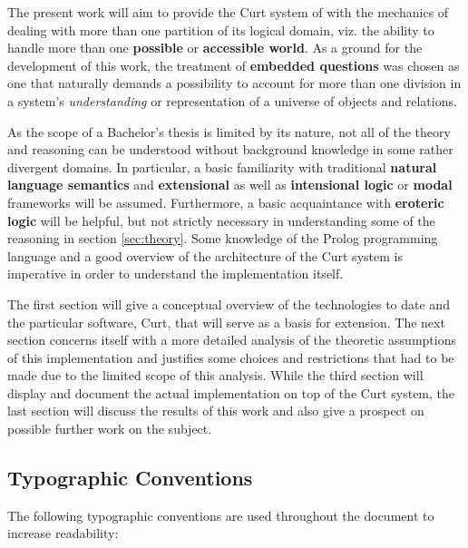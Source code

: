 \documentclass[a4paper]{article}
\newcommand{\term}[1]{\textsf{\textbf{#1}}} %
\newcommand{\pn}{\textsf} %
\newcommand{\curt}{\pn{Curt}}
\newcommand{\prol}{\pn{Prolog}}
\theoremstyle{remark}
\theoremstyle{remark}
\theoremstyle{definition}
\theoremstyle{definition}
\begin{document}
The present work will aim to provide the \curt{} system of
\cite{blackburnbos:cl1} with the mechanics of dealing with more than one
partition of its logical domain, viz. the ability to handle more than one
\term{possible} or \term{accessible world}. As a ground for the development of this
work, the treatment of \term{embedded questions} was chosen as one that
naturally demands a possibility to account for more than one division in a
system's \emph{understanding} or representation of a universe of objects and
relations.

As the scope of a Bachelor's thesis is limited by its nature, not all of the
theory and reasoning can be understood without background knowledge in some
rather divergent domains. In particular, a basic familiarity with traditional
\term{natural language semantics} and \term{extensional} as well as
\term{intensional logic} or \term{modal} frameworks will be assumed.
Furthermore, a basic acquaintance with \term{eroteric logic} will be helpful,
but not strictly necessary in understanding some of the reasoning in section
\ref{sec:theory}.  Some knowledge of the \prol{} programming language and a good
overview of the architecture of the \curt{} system is imperative in order to
understand the implementation itself.

The first section will give a conceptual overview of the technologies to date
and the particular software, \curt, that will serve as a basis for extension.
The next section concerns itself with a more detailed analysis of the theoretic
assumptions of this implementation and justifies some choices and restrictions
that had to be made due to the limited scope of this analysis. While the
third section will display and document the actual implementation on top of the
\curt{} system, the last section will discuss the results of this work and also
give a prospect on possible further work on the subject.

\subsection{Typographic Conventions}

The following typographic conventions are used throughout the document to
increase readability:
\end{document}
